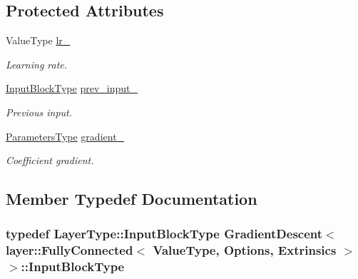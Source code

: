 \subsection*{Protected Attributes}
\begin{DoxyCompactItemize}
\item 
Value\-Type \hyperlink{class_gradient_descent_3_01layer_1_1_fully_connected_3_01_value_type_00_01_options_00_01_extrinsics_01_4_01_4_a8d9026efb5e5d408ad24d0176563dd96}{lr\-\_\-}
\begin{DoxyCompactList}\small\item\em Learning rate. \end{DoxyCompactList}\item 
\hyperlink{class_gradient_descent_3_01layer_1_1_fully_connected_3_01_value_type_00_01_options_00_01_extrinsics_01_4_01_4_aae3ae2c5a328fbe448821b79f64a4d01}{Input\-Block\-Type} \hyperlink{class_gradient_descent_3_01layer_1_1_fully_connected_3_01_value_type_00_01_options_00_01_extrinsics_01_4_01_4_a7c037c4374ffc88f67aa8a7ea95d5703}{prev\-\_\-input\-\_\-}
\begin{DoxyCompactList}\small\item\em Previous input. \end{DoxyCompactList}\item 
\hyperlink{class_gradient_descent_3_01layer_1_1_fully_connected_3_01_value_type_00_01_options_00_01_extrinsics_01_4_01_4_abfd6a00757020163a13bff71fccf2c48}{Parameters\-Type} \hyperlink{class_gradient_descent_3_01layer_1_1_fully_connected_3_01_value_type_00_01_options_00_01_extrinsics_01_4_01_4_a80335475cd01026083a3206769791a37}{gradient\-\_\-}
\begin{DoxyCompactList}\small\item\em Coefficient gradient. \end{DoxyCompactList}\end{DoxyCompactItemize}


\subsection{Member Typedef Documentation}
\hypertarget{class_gradient_descent_3_01layer_1_1_fully_connected_3_01_value_type_00_01_options_00_01_extrinsics_01_4_01_4_aae3ae2c5a328fbe448821b79f64a4d01}{
\subsubsection[{Input\-Block\-Type}]{\setlength{\rightskip}{0pt plus 5cm}typedef Layer\-Type\-::\-Input\-Block\-Type {\bf Gradient\-Descent}$<$ layer\-::\-Fully\-Connected$<$ Value\-Type, Options, Extrinsics $>$ $>$\-::{\bf Input\-Block\-Type}}}\label{class_gradient_descent_3_01layer_1_1_fully_connected_3_01_value_type_00_01_options_00_01_extrinsics_01_4_01_4_aae3ae2c5a328fbe448821b79f64a4d01}


